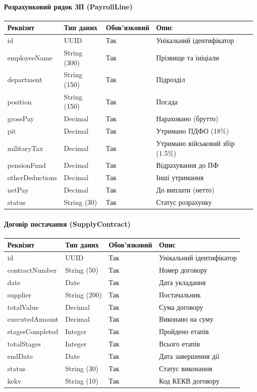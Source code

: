 \documentclass{article}
\begin{document}
\paragraph{Розрахунковий рядок ЗП (PayrollLine)}
\begin{longtable}{p{3.5cm}p{3.5cm}p{2cm}p{5cm}}
\toprule
\textbf{Реквізит} & \textbf{Тип даних} & \textbf{Обов'язковий} & \textbf{Опис} \\
\midrule
id & UUID & Так & Унікальний ідентифікатор \\
employeeName & String (300) & Так & Прізвище та ініціали \\
department & String (150) & Так & Підрозділ \\
position & String (150) & Так & Посада \\
grossPay & Decimal & Так & Нараховано (брутто) \\
pit & Decimal & Так & Утримано ПДФО (18\%) \\
militaryTax & Decimal & Так & Утримано військовий збір (1.5\%) \\
pensionFund & Decimal & Так & Відрахування до ПФ \\
otherDeductions & Decimal & Так & Інші утримання \\
netPay & Decimal & Так & До виплати (нетто) \\
status & String (30) & Так & Статус розрахунку \\
\bottomrule
\end{longtable}

\paragraph{Договір постачання (SupplyContract)}
\begin{longtable}{p{3.5cm}p{3.5cm}p{2cm}p{5cm}}
\toprule
\textbf{Реквізит} & \textbf{Тип даних} & \textbf{Обов'язковий} & \textbf{Опис} \\
\midrule
id & UUID & Так & Унікальний ідентифікатор \\
contractNumber & String (50) & Так & Номер договору \\
date & Date & Так & Дата укладання \\
supplier & String (200) & Так & Постачальник \\
totalValue & Decimal & Так & Сума договору \\
executedAmount & Decimal & Так & Виконано на суму \\
stagesCompleted & Integer & Так & Пройдено етапів \\
totalStages & Integer & Так & Всього етапів \\
endDate & Date & Так & Дата завершення дії \\
status & String (30) & Так & Статус виконання \\
kekv & String (10) & Так & Код КЕКВ договору \\
\bottomrule
\end{longtable}
\end{document}
